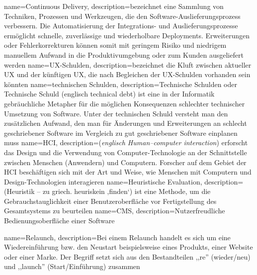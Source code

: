 {
	name=Continuous Delivery,
	description={bezeichnet eine Sammlung von Techniken, Prozessen und Werkzeugen, die den Software-Auslieferungsprozess verbessern. Die Automatisierung der Integrations- und Auslieferungsprozesse ermöglicht schnelle, zuverlässige und wiederholbare Deployments. Erweiterungen oder Fehlerkorrekturen können somit mit geringem Risiko und niedrigem manuellem Aufwand in die Produktivumgebung oder zum Kunden ausgeliefert werden}
}
{
	name=UX-Schulden,
	description={bezeichnet die Kluft zwischen aktueller UX und der künftigen UX, die nach Begleichen der UX-Schulden vorhanden sein könnten}
}
{
	name=technischen Schulden,
	description={Technische Schulden oder Technische Schuld (englisch technical debt) ist eine in der Informatik gebräuchliche Metapher für die möglichen Konsequenzen schlechter technischer Umsetzung von Software. Unter der technischen Schuld versteht man den zusätzlichen Aufwand, den man für Änderungen und Erweiterungen an schlecht geschriebener Software im Vergleich zu gut geschriebener Software einplanen muss}
}
{
	name=HCI,
	description={(\textit{englisch Human–computer interaction}) erforscht das Design und die Verwendung von Computer-Technologie an der Schnittstelle zwischen Menschen (Anwendern) und Computern. Forscher auf dem Gebiet der HCI beschäftigen sich mit der Art und Weise, wie Menschen mit Computern und Design-Technologien interagieren}
}
{
	name=Heuristische Evaluation,
	description={(Heuristik – zu griech. heuriskein ‚finden‘) ist eine Methode, um die Gebrauchstauglichkeit einer Benutzeroberfläche vor Fertigstellung des Gesamtsystems zu beurteilen}
}
{
	name=CMS,
	description={Nutzerfreudliche Bedienungsoberfläche einer Software}
}

{
	name=Relaunch,
	description={Bei einem Relaunch handelt es sich um eine Wiedereinführung bzw. den Neustart beispielsweise eines Produkts, einer Website oder einer Marke. Der Begriff setzt sich aus den Bestandteilen ,,re'' (wieder/neu) und ,,launch'' (Start/Einführung) zusammen}
}

